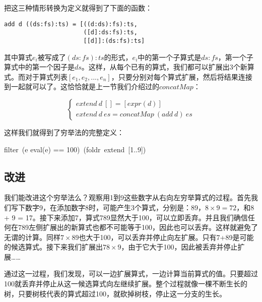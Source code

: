 \documentclass{article}
\begin{document}
把这三种情形转换为定义就得到了下面的函数：

\lstset{frame = none}
\begin{lstlisting}
add d ((ds:fs):ts) = [((d:ds):fs):ts,
                      ([d]:ds:fs):ts,
                      [[d]]:(ds:fs):ts]
\end{lstlisting}

其中算式$e_i$被写成了$(ds:fs):ts$的形式，$e_i$中的第一个子算式是$ds:fs$，第一个子算式中的第一个因子是$ds$。这样，从每个已有的算式，我们都可以扩展出3个新算式。而对于算式列表$[e_1, e_2, ..., e_n]$，只要分别对每个算式扩展，然后将结果连接到一起就可以了。这恰恰就是上一节我们介绍过的$concatMap$：

\[
\begin{cases}
extend\ d\ [] = [expr(d)] \\
extend\ d\ es = concatMap\ (add\ d)\ es
\end{cases}
\]

这样我们就得到了穷举法的完整定义：

\be
filter\ (e \mapsto eval(e) == 100)\ (foldr\ extend\ [1..9])
\label{eq:puzzle100-basic}
\ee

\subsection{改进}

我们能改进这个穷举法么？观察用1到9这些数字从右向左穷举算式的过程。首先我们写下数字9，在添加数字8时，可能产生3个算式，分别是：89，$8 \times 9 = 72$，和8 + 9 = 17。接下来添加7，算式789显然大于100，可以立即丢弃。并且我们确信任何在789左侧扩展出的新算式也都不可能等于100，因此也可以丢弃。这样就避免了无谓的计算。同样$7 \times 89$也大于100，可以丢弃并停止向左扩展。只有7+89是可能的候选算式。接下来我们扩展出$78 \times 9$，由于它大于100，因此被丢弃并停止扩展……

通过这一过程，我们发现，可以一边扩展算式，一边计算当前算式的值。只要超过100就丢弃并停止从这一候选算式向左继续扩展。整个过程就像一棵不断生长的树，只要树枝代表的算式超过100，就砍掉树枝，停止这一分支的生长。
\end{document}

